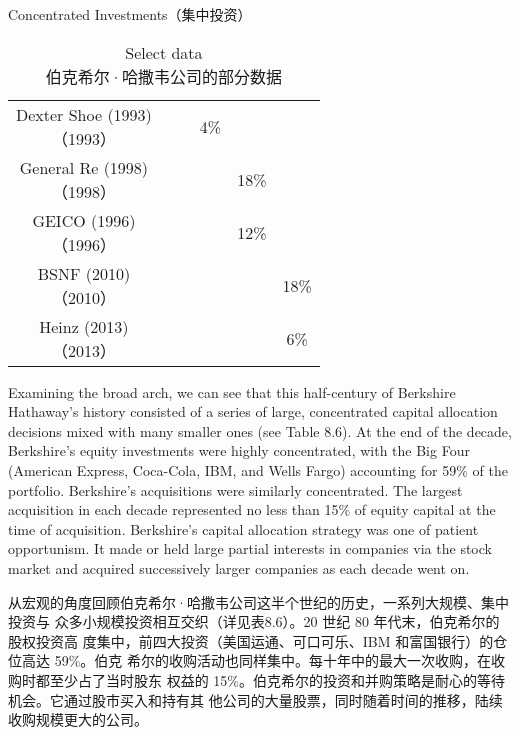 \begin{section}{Concentrated Investments（集中投资）}
\begin{table}[!htbp]
\begin{center}
\begin{tabular}{cccccc}
      \makecell[c]{Dexter Shoe (1993) \\ （1993）} & & & 4\% & & \\
      \makecell[c]{General Re (1998) \\ （1998）} & & & & 18\% & \\
      \makecell[c]{GEICO (1996) \\ （1996）} & & & & 12\% & \\
      \makecell[c]{BSNF (2010) \\ （2010）} & & & & & 18\% \\
      \makecell[c]{Heinz (2013) \\ （2013）} & & & & & 6\% \\
      \bottomrule
    \end{tabular}
    \caption{Select data \\ 伯克希尔·哈撒韦公司的部分数据}
  \end{center}
\end{table}



\begin{verseparallel}
  {
    Examining the broad arch, we can see that this half-century of Berkshire
    Hathaway's history consisted of a series of large, concentrated capital
    allocation decisions mixed with many smaller ones (see Table 8.6). At the
    end of the decade, Berkshire's equity investments were highly concentrated,
    with the Big Four (American Express, Coca-Cola, IBM, and Wells Fargo)
    accounting for 59\% of the portfolio. Berkshire's acquisitions were
    similarly concentrated. The largest acquisition in each decade represented
    no less than 15\% of equity capital at the time of acquisition. Berkshire's
    capital allocation strategy was one of patient opportunism. It made or held
    large partial interests in companies via the stock market and acquired
    successively larger companies as each decade went on. \\
  }
  {

    从宏观的角度回顾伯克希尔·哈撒韦公司这半个世纪的历史，一系列大规模、集中投资与
    众多小规模投资相互交织（详见表8.6）。20 世纪 80 年代末，伯克希尔的股权投资高
    度集中，前四大投资（美国运通、可口可乐、IBM 和富国银行）的仓位高达 59\%。伯克
    希尔的收购活动也同样集中。每十年中的最大一次收购，在收购时都至少占了当时股东
    权益的 15\%。伯克希尔的投资和并购策略是耐心的等待机会。它通过股市买入和持有其
    他公司的大量股票，同时随着时间的推移，陆续收购规模更大的公司。

  }
\end{verseparallel}
\end{section}

